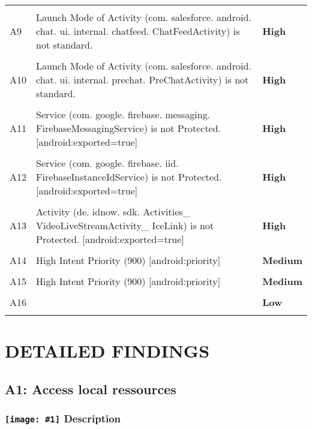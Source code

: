 \documentclass[12p]{article}
\newcommand{\icon}[1]{\texttt{[image: \#1]}}
\begin{document}
\begin{longtable}{p{0.5cm} p{10cm} p{1.5cm}}
\hline\\	A9&Launch Mode of Activity \newline (com. salesforce. android. chat. ui. internal. chatfeed. ChatFeedActivity) is not standard.& \color{ferrarired}\textbf{High} \\
\hline\\	A10&Launch Mode of Activity \newline (com. salesforce. android. chat. ui. internal. prechat. PreChatActivity) is not standard.& \color{ferrarired}\textbf{High} \\
\hline\\	A11&Service \newline (com. google. firebase. messaging. FirebaseMessagingService) is not Protected. [android:exported=true]& \color{ferrarired}\textbf{High} \\
\hline\\	A12&Service \newline (com. google. firebase. iid. FirebaseInstanceIdService) is not Protected. [android:exported=true]& \color{ferrarired}\textbf{High} \\
\hline\\	A13&Activity \newline (de. idnow. sdk. Activities\_ VideoLiveStreamActivity\_ IceLink) is not Protected. [android:exported=true]& \color{ferrarired}\textbf{High} \\
\hline\\	A14&High Intent Priority \newline (900) [android:priority]& \color{orange(colorwheel)}\textbf{Medium} \\
\hline\\	A15&High Intent Priority \newline (900) [android:priority]& \color{orange(colorwheel)}\textbf{Medium} \\
\hline\\	A16&& \color{amber}\textbf{Low} \\
\hline\\	\end{longtable}
\cleardoublepage
\newpage
\section{DETAILED FINDINGS}
\subsection{A1: Access local ressources}
\subsubsection*{\protect\icon{/home/miki/Documents/GITHUB/AndroidPermissions/python/vulns/report_icons/basic_sheet.png} Description}
\end{document}
